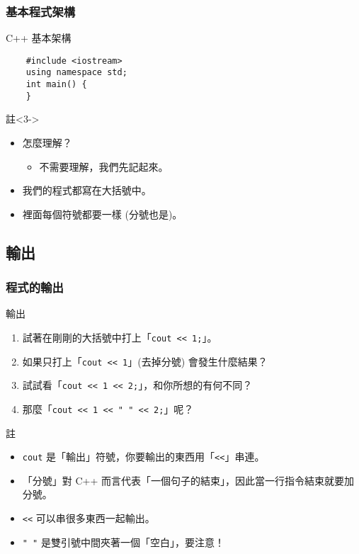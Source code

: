 \documentclass[utf8]{beamer}
\begin{document}
\begin{CJK}{UTF8}{bkai}
\begin{frame}[fragile]
  \frametitle{基本程式架構}
  \begin{block}{C++ 基本架構}
    \pause
    \begin{lstlisting}
    #include <iostream>
    using namespace std;
    int main() {
    }
    \end{lstlisting}
  \end{block}
  \begin{exampleblock}{註}<3->
    \begin{itemize}
    \item<3-> 怎麼理解？
      \begin{itemize}[<4->]
      \item 不需要理解，我們先記起來。
      \end{itemize}
    \item<5-> 我們的程式都寫在\alert{大括號}中。
    \item<6-> 裡面每個符號都要一樣 (分號也是)。
    \end{itemize}
  \end{exampleblock}
\end{frame}

\subsection{輸出}

\begin{frame}[fragile]
  \frametitle{程式的輸出}
  \begin{block}{輸出}
    \begin{enumerate}
    \item<1-> 試著在剛剛的大括號中打上「\lstinline{cout << 1;}」。
    \item<3-> 如果只打上「\lstinline{cout << 1}」(去掉分號) 會發生什麼結果？
    \item<5-> 試試看「\lstinline{cout << 1 << 2;}」，和你所想的有何不同？
    \item<7-> 那麼「\lstinline{cout << 1 << " " << 2;}」呢？
    \end{enumerate}
  \end{block}
  \begin{exampleblock}{註}
    \begin{itemize}
    \item<2-> \lstinline{cout} 是「輸出」符號，你要輸出的東西用「\lstinline{<<}」串連。
    \item<4-> 「分號」對 C++ 而言代表「一個句子的結束」，因此當一行\alert{指令結束就要加分號}。
    \item<6-> \lstinline{<<} 可以串很多東西一起輸出。
    \item<7-> \lstinline{" "} 是雙引號中間夾著一個「空白」，\alert{要注意}！
    \end{itemize}
  \end{exampleblock}
\end{frame}


\end{CJK}
\end{document}
